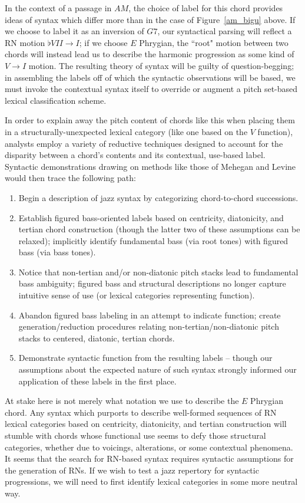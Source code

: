 In the context of a passage in $AM$, the choice of label for this chord provides ideas of syntax which differ more than in the case of Figure~\ref{am_bigu} above.  If we choose to label it as an inversion of $G7$, our syntactical parsing will reflect a RN motion $\flat VII \rightarrow I$; if we choose $E$ Phrygian, the ``root" motion between two chords will instead lead us to describe the harmonic progression as some kind of $V \rightarrow I$ motion.  The resulting theory of syntax will be guilty of question-begging; in assembling the labels off of which the syntactic observations will be based, we must invoke the contextual syntax itself to override or augment a pitch set-based lexical classification scheme.

In order to explain away the pitch content of chords like this when placing them in a structurally-unexpected lexical category (like one based on the $V$ function), analysts employ a variety of reductive techniques designed to account for the disparity between a chord's contents and its contextual, use-based label.  Syntactic demonstrations drawing on methods like those of Mehegan and Levine would then trace the following path:
\begin{enumerate}
	\item Begin a description of jazz syntax by categorizing chord-to-chord successions.
	\item Establish figured bass-oriented labels based on centricity, diatonicity, and tertian chord construction (though the latter two of these assumptions can be relaxed); implicitly identify fundamental bass (via root tones) with figured bass (via bass tones).
	\item Notice that non-tertian and/or non-diatonic pitch stacks lead to fundamental bass ambiguity; figured bass and structural descriptions no longer capture intuitive sense of use (or lexical categories representing function).
	\item Abandon figured bass labeling in an attempt to indicate function; create generation/reduction procedures relating non-tertian/non-diatonic pitch stacks to centered, diatonic, tertian chords.
	\item Demonstrate syntactic function from the resulting labels -- though our assumptions about the expected nature of such syntax strongly informed our application of these labels in the first place.
\end{enumerate}

At stake here is not merely what notation we use to describe the $E$ Phrygian chord.  Any syntax which purports to describe well-formed sequences of RN lexical categories based on centricity, diatonicity, and tertian construction will stumble with chords whose functional use seems to defy those structural categories, whether due to voicings, alterations, or some contextual phenomena.  It seems that the search for RN-based syntax requires syntactic assumptions for the generation of RNs.  If we wish to test a jazz repertory for syntactic progressions, we will need to first identify lexical categories in some more neutral way.

